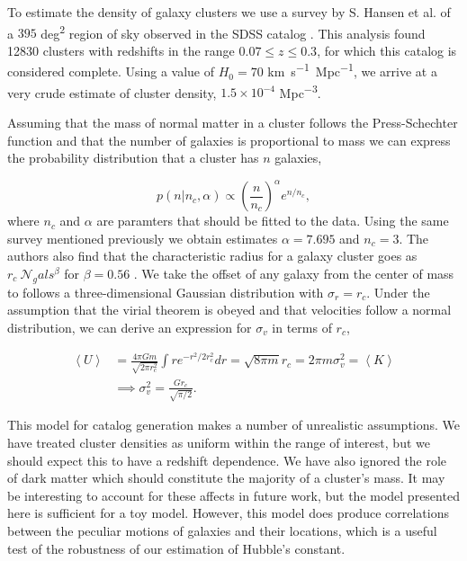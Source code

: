 To estimate the density of galaxy clusters we use a survey by S. Hansen et al. of a $395$ \si{deg^2} region of sky observed in the SDSS catalog \cite{Hansen_2005}. This analysis found 12830 clusters with redshifts in the range $0.07\leq z\leq 0.3$, for which this catalog is considered complete. Using a value of $H_0=70$ \si{km.s^{-1}.Mpc^{-1}}, we arrive at a very crude estimate of cluster density, $1.5\times 10^{-4}$ \si{Mpc^{-3}}.

Assuming that the mass of normal matter in a cluster follows the Press-Schechter function \cite{Press_1974} and that the number of galaxies is proportional to mass we can express the probability distribution that a cluster has $n$ galaxies,

\begin{equation}
p(n | n_c, \alpha) \propto \left( \frac{n}{n_c} \right)^{\alpha}e^{n/n_c},
\end{equation}
where $n_c$ and $\alpha$ are paramters that should be fitted to the data. Using the same survey mentioned previously we obtain estimates $\alpha = 7.695$ and $n_c = 3$. The authors also find that the characteristic radius for a galaxy cluster goes as $r_c ~ \mathcal{N}_gals^\beta$ for $\beta=0.56$ \cite{Hansen_2005}. We take the offset of any galaxy from the center of mass to follows a three-dimensional Gaussian distribution with $\sigma_r = r_c$. Under the assumption that the virial theorem is obeyed and that velocities follow a normal distribution, we can derive an expression for $\sigma_v$ in terms of $r_c$,

\begin{align}
  \left<U\right> &= \frac{4\pi Gm}{\sqrt{2\pi r_c^2}} \int r e^{-r^2 / 2r_c^2} dr = \sqrt{8\pi m}r_c = 2\pi m\sigma_v^2 = \left<K\right> \nonumber\\
  &\implies \sigma_v^2 = \frac{G r_c}{\sqrt{\pi/2}}.
\end{align}

This model for catalog generation makes a number of unrealistic assumptions. We have treated cluster densities as uniform within the range of interest, but we should expect this to have a redshift dependence. We have also ignored the role of dark matter which should constitute the majority of a cluster's mass. It may be interesting to account for these affects in future work, but the model presented here is sufficient for a toy model. However, this model does produce correlations between the peculiar motions of galaxies and their locations, which is a useful test of the robustness of our estimation of Hubble's constant.

